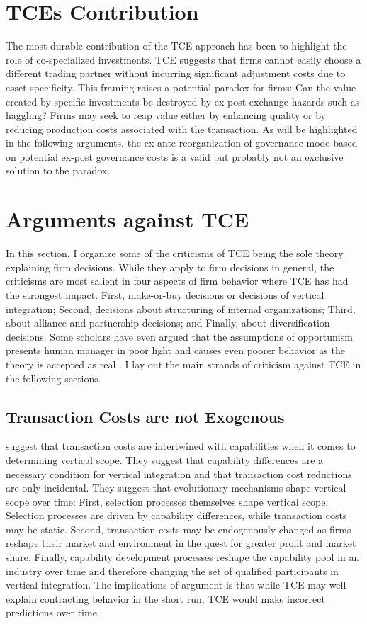 \documentclass[12pt,letterpaper]{article}
\begin{document}
\section{TCE\textquotesingle s Contribution}
The most durable contribution of the TCE approach has been to highlight the role of co-specialized investments. TCE suggests that firms cannot easily choose a different trading partner without incurring significant adjustment costs due to asset specificity. This framing raises a potential paradox for firms: Can the value created by specific investments be destroyed by ex-post exchange hazards such as haggling? Firms may seek to reap value either by enhancing quality or by reducing production costs associated with the transaction. As will be highlighted in the following arguments, the ex-ante reorganization of governance mode based on potential ex-post governance costs is a valid but probably not an exclusive solution to the paradox.

\section{Arguments against TCE}
In this section, I organize some of the criticisms of TCE being the sole theory explaining firm decisions. While they apply to firm decisions in general, the criticisms are most salient in four aspects of firm behavior where TCE has had the strongest impact. First, make-or-buy decisions or decisions of vertical integration; Second, decisions about structuring of internal organizations; Third, about alliance and partnership decisions; and Finally, about diversification decisions. Some scholars have even argued that the assumptions of opportunism presents human manager in poor light and causes even poorer behavior as the theory is accepted as real \citep{Ghoshal1996}. I lay out the main strands of criticism against TCE in the following sections.

\subsection{Transaction Costs are not Exogenous}
\cite{Jacobides2005a} suggest that transaction costs are intertwined with capabilities when
it comes to determining vertical scope. They suggest that capability differences are a necessary
condition for vertical integration and that transaction cost reductions are only incidental. They
suggest that evolutionary mechanisms shape vertical scope over time: First, selection processes
themselves shape vertical scope. Selection processes are driven by capability differences,
while transaction costs may be static. Second, transaction costs may be endogenously changed as firms reshape their market and
environment in the quest for greater profit and market share.
Finally, capability development processes reshape the capability pool in an industry over time
and therefore changing the set of qualified participants in vertical integration. The implications of \cite{Jacobides2005a} argument is that while TCE may well explain contracting behavior in the short run, TCE would make incorrect predictions over time.
\end{document}
